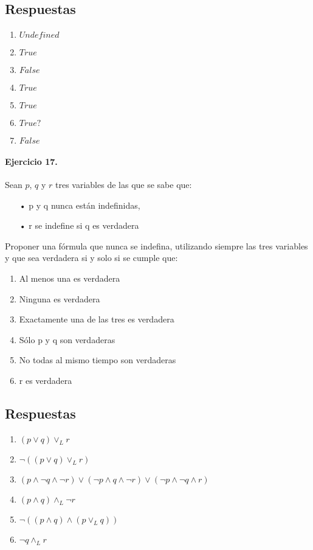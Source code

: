 \documentclass[a4paper]{article}
\begin{document}
\subsection*{Respuestas}

\begin{multicols}{2}
\begin{enumerate}[label=\alph*)]
\item $Undefined$
\item $True$
\item $False$
\item $True$
\item $True$
\item $True?$
\item $False$
\end{enumerate}
\end{multicols}

\paragraph{
\textbf{Ejercicio 17.}}Sean $p$, $q$ y $r$ tres variables de las que se sabe que:

\begin{enumerate}
\item[•] p y q nunca están indefinidas,
\item[•] r se indefine si q es verdadera
\end{enumerate}
Proponer una fórmula que nunca se indefina, utilizando siempre las tres variables y que sea verdadera si y solo si se cumple que:
\begin{multicols}{2}
\begin{enumerate}[label=\alph*)]
\item Al menos una es verdadera
\item Ninguna es verdadera
\item Exactamente una de las tres es verdadera
\item Sólo p y q son verdaderas
\item No todas al mismo tiempo son verdaderas
\item r es verdadera
\end{enumerate}
\end{multicols}


\subsection*{Respuestas}

\begin{multicols}{2}
\begin{enumerate}[label=\alph*)]
\item $ (p\vee q)\vee _L r$
\item $ \neg ((p\vee q)\vee _L r)$
\item $ (p\wedge \neg q \wedge \neg r)\vee (\neg p\wedge q \wedge \neg r)\vee (\neg p\wedge \neg q \wedge r) $
\item $ (p \wedge q)\wedge _L \neg r$
\item $ \neg ((p\wedge q)\wedge (p\vee _L q))$
\item $ \neg q \wedge _L r$
\end{enumerate}
\end{multicols}
\end{document}
